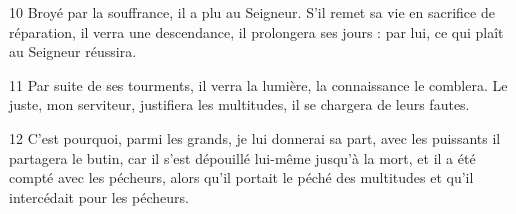
10 Broyé par la souffrance, il a plu au Seigneur. S’il remet sa vie en sacrifice de réparation, il verra une descendance, il prolongera ses jours : par lui, ce qui plaît au Seigneur réussira.

11 Par suite de ses tourments, il verra la lumière, la connaissance le comblera. Le juste, mon serviteur, justifiera les multitudes, il se chargera de leurs fautes.

12 C’est pourquoi, parmi les grands, je lui donnerai sa part, avec les puissants il partagera le butin, car il s’est dépouillé lui-même jusqu’à la mort, et il a été compté avec les pécheurs, alors qu’il portait le péché des multitudes et qu’il intercédait pour les pécheurs.